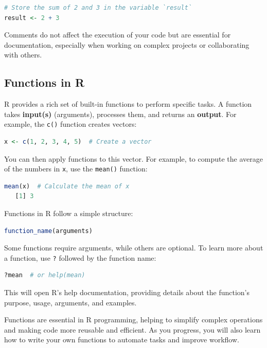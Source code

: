 \documentclass[
  11pt,
]{book}
\newcommand{\passthrough}[1]{#1}
\theoremstyle{definition}
\theoremstyle{definition}
\theoremstyle{definition}
\theoremstyle{definition}
\theoremstyle{remark}
\begin{document}
\begin{lstlisting}[language=R]
# Store the sum of 2 and 3 in the variable `result`
result <- 2 + 3
\end{lstlisting}

Comments do not affect the execution of your code but are essential for documentation, especially when working on complex projects or collaborating with others.

\subsection{Functions in R}\label{functions-in-r}

R provides a rich set of built-in functions to perform specific tasks. A function takes \textbf{input(s)} (arguments), processes them, and returns an \textbf{output}. For example, the \passthrough{\lstinline!c()!} function creates vectors:

\begin{lstlisting}[language=R]
x <- c(1, 2, 3, 4, 5)  # Create a vector
\end{lstlisting}

You can then apply functions to this vector. For example, to compute the average of the numbers in \passthrough{\lstinline!x!}, use the \passthrough{\lstinline!mean()!} function:

\begin{lstlisting}[language=R]
mean(x)  # Calculate the mean of x
   [1] 3
\end{lstlisting}

Functions in R follow a simple structure:

\begin{lstlisting}[language=R]
function_name(arguments)
\end{lstlisting}

Some functions require arguments, while others are optional. To learn more about a function, use \passthrough{\lstinline!?!} followed by the function name:

\begin{lstlisting}[language=R]
?mean  # or help(mean)
\end{lstlisting}

This will open R's help documentation, providing details about the function's purpose, usage, arguments, and examples.

Functions are essential in R programming, helping to simplify complex operations and making code more reusable and efficient. As you progress, you will also learn how to write your own functions to automate tasks and improve workflow.
\end{document}
